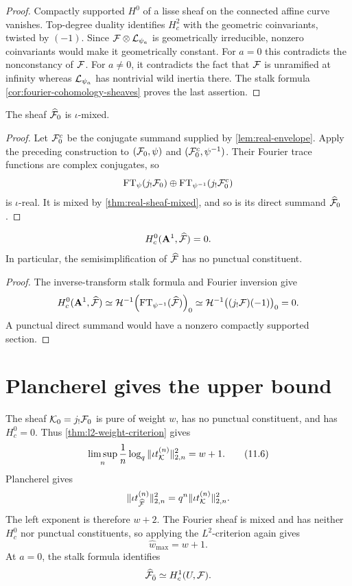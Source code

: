 \begin{proof}
Compactly supported \(H^0\) of a lisse sheaf on the connected affine
curve vanishes.  Top-degree duality identifies \(H_c^2\) with the
geometric coinvariants, twisted by \((-1)\).  Since
\(\mathcal F\otimes\mathcal L_{\psi_a}\) is geometrically irreducible, nonzero
coinvariants would make it geometrically constant.  For \(a=0\) this
contradicts the nonconstancy of \(\mathcal F\).  For \(a\ne0\), it contradicts
the fact that \(\mathcal F\) is unramified at infinity whereas
\(\mathcal L_{\psi_a}\) has nontrivial wild inertia there.  The stalk formula
\cref{cor:fourier-cohomology-sheaves} proves the last assertion.
\end{proof}

\begin{lemma}
\label{lem:fourier-mixed-before-estimate}
The sheaf \(\widehat{\mathcal F}_0\) is \(\iota\)-mixed.
\end{lemma}

\begin{proof}
Let \(\mathcal F_0^c\) be the conjugate summand supplied by
\cref{lem:real-envelope}.  Apply the preceding construction to
\((\mathcal F_0,\psi)\) and \((\mathcal F_0^c,\psi^{-1})\).  Their Fourier trace
functions are complex conjugates, so
\[
 \operatorname{FT}_\psi(j_!\mathcal F_0)\oplus
 \operatorname{FT}_{\psi^{-1}}(j_!\mathcal F_0^c)
\]
is \(\iota\)-real.  It is mixed by
\cref{thm:real-sheaf-mixed}, and so is its direct summand
\(\widehat{\mathcal F}_0\).
\end{proof}

\begin{lemma}
\label{lem:fourier-no-hc0}
\[
 H_c^0(\mathbf A^1,\widehat{\mathcal F})=0.
\]
In particular, the semisimplification of \(\widehat{\mathcal F}\) has no
punctual constituent.
\end{lemma}

\begin{proof}
The inverse-transform stalk formula and Fourier inversion give
\[
 H_c^0(\mathbf A^1,\widehat{\mathcal F})
 \simeq
 \mathcal H^{-1}\!\left(
  \operatorname{FT}_{\psi^{-1}}(\widehat{\mathcal F})
 \right)_0
 \simeq
 \mathcal H^{-1}\bigl((j_!\mathcal F)(-1)\bigr)_0=0.
\]
A punctual direct summand would have a nonzero compactly supported
section.
\end{proof}

\section{Plancherel gives the upper bound}

The sheaf \(\mathcal K_0=j_!\mathcal F_0\) is pure of weight \(w\), has no punctual
constituent, and has \(H_c^0=0\).  Thus
\cref{thm:l2-weight-criterion} gives
\[
 \limsup_n\frac1n\log_q
 \|\iota t_{\mathcal K}^{(n)}\|_{2,n}^2=w+1.
\tag{11.6}\label{eq:K-l2-growth}
\]
Plancherel gives
\[
 \|\iota t_{\widehat{\mathcal F}}^{(n)}\|_{2,n}^2
 =q^n\|\iota t_{\mathcal K}^{(n)}\|_{2,n}^2.
\]
The left exponent is therefore \(w+2\).  The Fourier sheaf is mixed and
has neither \(H_c^0\) nor punctual constituents, so applying the
\(L^2\)-criterion again gives
\[
  \widehat w_{\max}=w+1.
\tag{11.7}\label{eq:fourier-weight-shift}
\]
At \(a=0\), the stalk formula identifies
\[
 \widehat{\mathcal F}_{\bar0}\simeq H_c^1(U,\mathcal F).
\]


